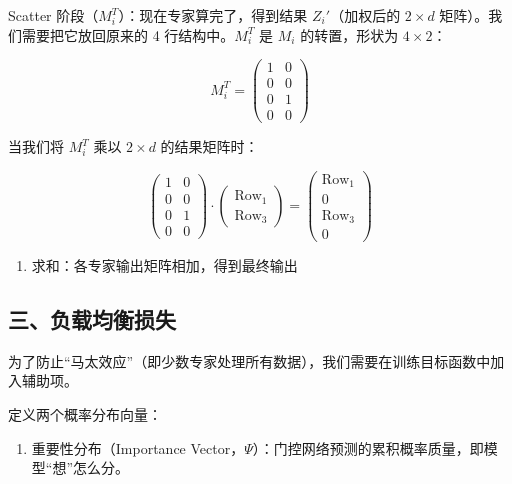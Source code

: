 Scatter 阶段（\(M_i^T\)）：现在专家算完了，得到结果 \(Z_i'\)（加权后的 \(2 \times d\) 矩阵）。我们需要把它放回原来的 4 行结构中。\(M_i^T\) 是 \(M_i\) 的转置，形状为 \(4 \times 2\)：

\[
M_i^T =
\begin{pmatrix}
1 & 0 \\
0 & 0 \\
0 & 1 \\
0 & 0
\end{pmatrix}
\]

当我们将 \(M_i^T\) 乘以 \(2 \times d\) 的结果矩阵时：

\[
\begin{pmatrix}
1 & 0 \\
0 & 0 \\
0 & 1 \\
0 & 0
\end{pmatrix}
\cdot
\begin{pmatrix}
\mathrm{Row}_1 \\
\mathrm{Row}_3
\end{pmatrix}
=
\begin{pmatrix}
\mathrm{Row}_1 \\
0 \\
\mathrm{Row}_3 \\
0
\end{pmatrix}
\]

\begin{enumerate}
\def\labelenumi{\arabic{enumi}.}
\setcounter{enumi}{3}
\tightlist
\item
  求和：各专家输出矩阵相加，得到最终输出
\end{enumerate}

\hypertarget{ux4e09ux8d1fux8f7dux5747ux8861ux635fux5931}{%
\subsection{三、负载均衡损失}\label{ux4e09ux8d1fux8f7dux5747ux8861ux635fux5931}}

为了防止``马太效应''（即少数专家处理所有数据），我们需要在训练目标函数中加入辅助项。

定义两个概率分布向量：

\begin{enumerate}
\def\labelenumi{\arabic{enumi}.}
\tightlist
\item
  重要性分布（Importance Vector，\(\Psi\)）：门控网络预测的累积概率质量，即模型``想''怎么分。
\end{enumerate}

